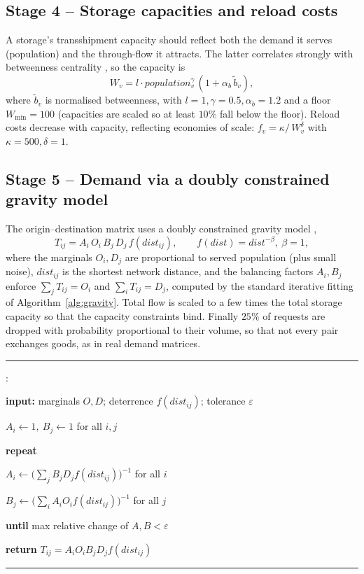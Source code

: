 \documentclass[runningheads]{llncs}
\newcounter{algln}
\newenvironment{pcode}{%
  \setcounter{algln}{0}%
  \par\vspace{2pt}\hrule\vspace{3pt}%
  \begin{list}{\footnotesize\ttfamily\stepcounter{algln}\thealgln:}%
    {\setlength{\leftmargin}{2.2em}\setlength{\itemsep}{0pt}%
     \setlength{\parsep}{0pt}\setlength{\topsep}{0pt}}%
}{%
  \end{list}\vspace{2pt}\hrule\vspace{2pt}%
}
\newcommand{\KW}[1]{\textbf{#1}}
\newcommand{\IND}{\hspace*{1.3em}}
\begin{document}
\subsection{Stage 4 -- Storage capacities and reload costs}
A storage's transshipment capacity should reflect both the demand it serves
(population) and the through-flow it attracts. The latter correlates strongly
with betweenness centrality \cite{barthelemy2011,kirkley2018}, so the capacity is
\begin{equation}
W_v = l\cdot population_v^{\gamma}\,(1+\alpha_b\,\tilde b_v),
\end{equation}
where $\tilde b_v$ is normalised betweenness, with $l=1,\gamma=0.5,\alpha_b=1.2$
and a floor $W_{\min}=100$ (capacities are scaled so at least $10\%$ fall below
the floor). Reload costs decrease with capacity, reflecting economies of scale:
$f_v=\kappa/\,W_v^{\delta}$ with $\kappa=500,\delta=1$.

\subsection{Stage 5 -- Demand via a doubly constrained gravity model}
The origin--destination matrix uses a doubly constrained gravity model
\cite{wilson1967,ortuzar},
\begin{equation}
T_{ij}=A_i\,O_i\,B_j\,D_j\,f(dist_{ij}), \qquad f(dist)=dist^{-\beta},\ \beta=1,
\end{equation}
where the marginals $O_i,D_j$ are proportional to served population (plus small
noise), $dist_{ij}$ is the shortest network distance, and the balancing factors
$A_i,B_j$ enforce $\sum_j T_{ij}=O_i$ and $\sum_i T_{ij}=D_j$, computed by the
standard iterative fitting of Algorithm~\ref{alg:gravity}. Total flow is scaled
to a few times the total storage capacity so that the capacity constraints bind.
Finally $25\%$ of requests are dropped with probability proportional to their
volume, so that not every pair exchanges goods, as in real demand matrices.

\begin{algorithm}[t]
\caption{Doubly constrained gravity balancing.}
\label{alg:gravity}
\begin{pcode}
\item \KW{input:} marginals $O,D$; deterrence $f(dist_{ij})$; tolerance $\varepsilon$
\item $A_i\gets 1,\ B_j\gets 1$ for all $i,j$
\item \KW{repeat}
\item \IND $A_i\gets \big(\sum_j B_j D_j f(dist_{ij})\big)^{-1}$ for all $i$
\item \IND $B_j\gets \big(\sum_i A_i O_i f(dist_{ij})\big)^{-1}$ for all $j$
\item \KW{until} max relative change of $A,B < \varepsilon$
\item \KW{return} $T_{ij}=A_iO_iB_jD_j f(dist_{ij})$
\end{pcode}
\end{algorithm}
\end{document}
